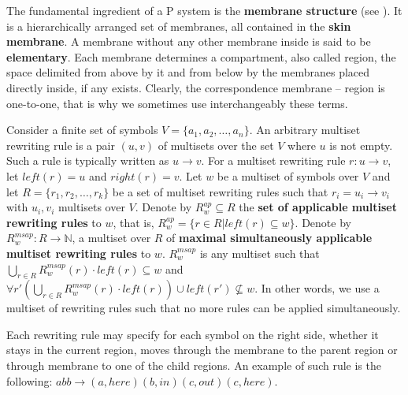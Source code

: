 \documentclass[a4paper,10pt]{article}
\begin{document}
The fundamental ingredient of a P system is the {\bf membrane structure} (see \cite{Paun2006Introduction}). It is a hierarchically arranged set of membranes, all contained in the {\bf skin membrane}. A membrane without any other membrane inside is said to be {\bf elementary}. Each membrane determines a compartment, also called region, the space delimited from above by it and from below by the membranes placed directly inside, if any exists. Clearly, the correspondence membrane – region is one-to-one, that is why we sometimes use interchangeably these terms.


Consider a finite set of symbols $V=\{a_1, a_2,\dots, a_n\}$. An arbitrary multiset rewriting rule is a pair $(u, v)$ of multisets over the set $V$ where $u$ is not empty. Such a rule is typically written as $u\rightarrow v$. For a multiset rewriting rule $r : u\rightarrow v$, let $left(r) = u$ and $right(r) = v$. Let $w$ be a multiset of symbols over $V$ and let $R=\{r_1, r_2,\dots, r_k\}$ be a set of multiset rewriting rules such that $r_i = u_i\rightarrow v_i$ with $u_i, v_i$ multisets over $V$. Denote by $R^{ap}_w\subseteq R$ the {\bf set of applicable multiset rewriting rules} to $w$, that is, $R^{ap}_w = \{r\in R|left(r)\subseteq w\}$. Denote by $R^{msap}_w: R\rightarrow \mathbb N$, a multiset over $R$ of {\bf maximal simultaneously applicable multiset rewriting rules} to $w$. $R^{msap}_w$ is any multiset such that $\displaystyle\bigcup_{r\in R} R^{msap}_w(r)\cdot left(r)\subseteq w$ and $\forall r' \left(\displaystyle\bigcup_{r\in R} R^{msap}_w(r)\cdot left(r)\right)\cup left(r')\nsubseteq w$. In other words, we use a multiset of rewriting rules such that no more rules can be applied simultaneously.



  
Each rewriting rule may specify for each symbol on the right side, whether it stays in the current region, moves through the membrane to the parent region or through membrane to one of the child regions. An example of such rule is the following: $abb\rightarrow (a,here)(b,in)(c,out)(c,here)$.









\end{document}
